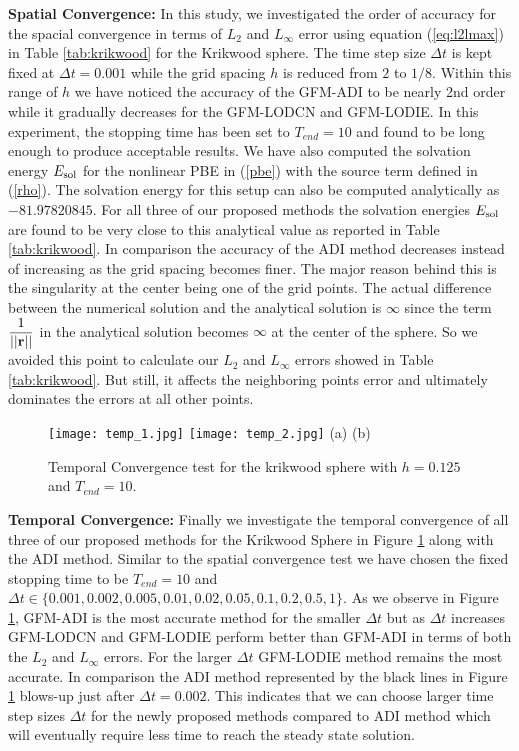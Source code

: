 \textbf{Spatial Convergence:}  In this study, we investigated the order of accuracy for the spacial convergence in terms of $L_2$ and $L_\infty$ error using equation (\ref{eq:l2lmax}) in Table \ref{tab:krikwood} for the Krikwood sphere. The time step size $\Delta t$ is kept fixed at $\Delta t = 0.001$ while the grid spacing $h$ is reduced from $2$ to $1/8$. Within this range of $h$ we have noticed the accuracy of the GFM-ADI to be nearly 2nd order while it gradually decreases for the GFM-LODCN and GFM-LODIE. In this experiment, the stopping time has been set to $T_{end} = 10$ and found to be long enough to produce acceptable results. We have also computed the solvation energy $E_{\rm sol}$ for the nonlinear PBE in (\ref{pbe}) with the source term defined in (\ref{rho}). The solvation energy for this setup can also be computed analytically as $-81.97820845$. For all three of our proposed methods the solvation energies $E_{\rm sol}$ are found to be very close to this analytical value as reported in Table \ref{tab:krikwood}. In comparison the accuracy of the ADI method decreases instead of increasing as the grid spacing becomes finer. The major reason behind this is the singularity at the center being one of the grid points. The actual difference between the numerical solution and the analytical solution is $\infty$ since the term $\displaystyle \frac{1}{||{\bf r}||} $ in the analytical solution becomes $\infty$ at the center of the sphere. So we avoided this point to calculate our $L_2$ and $L_\infty$ errors  showed in Table \ref{tab:krikwood}. But still, it affects the neighboring points error and ultimately dominates the errors at all other points.    

\begin{figure}[!ht]
	\centering
\texttt{[image: temp\_1.jpg]}
\texttt{[image: temp\_2.jpg]}
   (a)\hspace*{3in} (b)\\ 	
	\caption{Temporal Convergence test for the krikwood sphere with $h=0.125$ and $T_{end} = 10$.}
	\label{fig:temp_Krik}
\end{figure}

\textbf{Temporal Convergence:} Finally we investigate the temporal convergence of all three of our proposed methods for the Krikwood Sphere in Figure \ref{fig:temp_Krik} along with the ADI method. Similar to the spatial convergence test we have chosen the fixed stopping time to be $T_{end} = 10$ and $\Delta t \in \{0.001, 0.002, 0.005,0.01, 0.02, 0.05, 0.1, 0.2, 0.5, 1\}$. As we observe in Figure \ref{fig:temp_Krik}, GFM-ADI is the most accurate method for the smaller $\Delta t$ but as $\Delta t$ increases GFM-LODCN and GFM-LODIE perform better than GFM-ADI in terms of both the $L_2$ and $L_\infty$ errors. For the larger $\Delta t $ GFM-LODIE method remains the most accurate. In comparison the ADI method represented by the black lines in Figure \ref{fig:temp_Krik} blows-up just after $\Delta t = 0.002$. This indicates that we can choose larger time step sizes $\Delta t$ for the newly proposed methods compared to ADI method which will eventually require less time to reach the steady state solution.   


